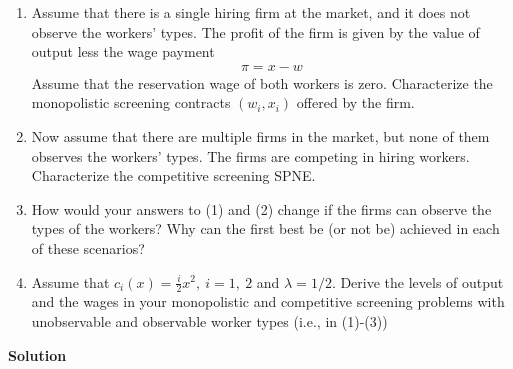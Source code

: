 \documentclass[a4paper]{article}
\begin{document}
\begin{enumerate}
	\item Assume that there is a single hiring firm at the market, and it does not observe the
	workers' types. The profit of the firm is given by the value of output less the wage
	payment
	\begin{align*}
	\pi = x - w
	\end{align*}
	Assume that the reservation wage of both workers is zero. Characterize the monopolistic screening contracts $(w_i, x_i)$ offered by the firm.
	\item Now assume that there are multiple firms in the market, but none of them observes
	the workers' types. The firms are competing in hiring workers. Characterize the
	competitive screening SPNE.
	\item How would your answers to (1) and (2) change if the firms can observe the types
	of the workers? Why can the first best be (or not be) achieved in each of these
	scenarios?
	\item Assume that $c_i(x) = \frac{i}{2}x^2,\ i = 1,\ 2$ and $\lambda = 1/2$. Derive the levels of output and the
	wages in your monopolistic and competitive screening problems with unobservable
	and observable worker types (i.e., in (1)-(3))
\end{enumerate}


\textbf{Solution}
\end{document}
